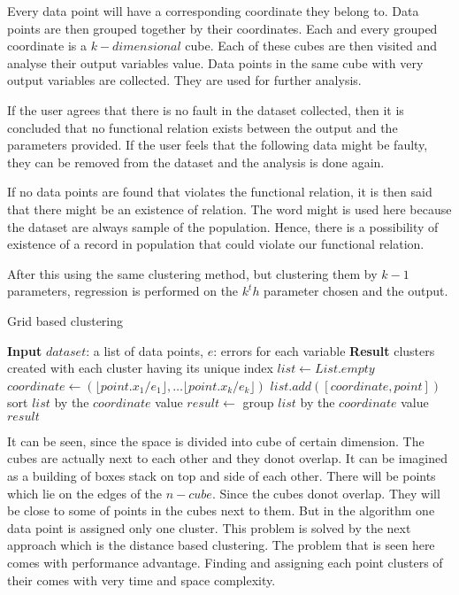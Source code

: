 Every data point will have a corresponding coordinate they belong to. Data points are then grouped together by their coordinates. Each and every grouped coordinate is a \(k-dimensional\) cube. Each of these cubes are then visited and analyse their output variables value. Data points in the same cube with very output variables are collected. They are used for further analysis.

If the user agrees that there is no fault in the dataset collected, then it is concluded that no functional relation exists between the output and the parameters provided. If the user feels that the following data might be faulty, they can be removed from the dataset and the analysis is done again.

If no data points are found that violates the functional relation, it is then said that there might be an existence of relation. The word might is used here because the dataset are always sample of the population. Hence, there is a possibility of existence of a record in population that could violate our functional relation.

After this using the same clustering method, but clustering them by \(k-1\) parameters, regression is performed on the \(k^th\) parameter chosen and the output.

\begin{algorithm}
	\caption{Grid based clustering}\label{gridExistence}
	\begin{algorithmic}[1]
		\State \textbf{Input} $dataset$: a list of data points, $e$: errors for each variable
		\State \textbf{Result} clusters created with each cluster having its unique index
		\State $list \gets List.empty$
		 
		\State $coordinate \gets (\lfloor point.x_{1}/e_1 \rfloor, \ldots \lfloor point.x_{k}/e_k \rfloor)$
		\State $list.add([coordinate, point])$
		\EndFor
		\State sort $list$ by the  $coordinate$ value 
		\State $result \gets$ group $list$ by the  $coordinate$ value 
        \State\Return $result$
		\EndProcedure
	\end{algorithmic}
\end{algorithm}

It can be seen, since the space is divided into cube of certain dimension. The cubes are actually next to each other and they donot overlap. It can be imagined as a building of boxes stack on top and side of each other. There will be points which lie on the edges of the \(n-cube\). Since the cubes donot overlap. They will be close to some of points in the cubes next to them. But in the algorithm one data point is assigned only one cluster. This problem is solved by the next approach which is the distance based clustering. The problem that is seen here comes with performance advantage. Finding and assigning each point clusters of their comes with very time and space complexity.

